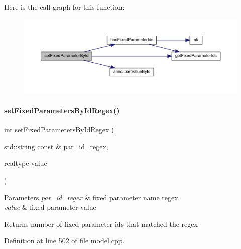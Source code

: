Here is the call graph for this function\+:
\nopagebreak
\begin{figure}[H]
\begin{center}
\leavevmode
\includegraphics[width=350pt]{classamici_1_1_model_adc0d24343c6fed2e797fb402f7c2d256_cgraph}
\end{center}
\end{figure}
\mbox{\label{classamici_1_1_model_acda9b9debfd3d6ac77e2d27a48bfb5d6}} 
\paragraph{\texorpdfstring{set\+Fixed\+Parameters\+By\+Id\+Regex()}{setFixedParametersByIdRegex()}}
{\footnotesize\ttfamily int set\+Fixed\+Parameters\+By\+Id\+Regex (\begin{DoxyParamCaption}\item[{std\+::string const \&}]{par\+\_\+id\+\_\+regex,  }\item[{\mbox{\hyperlink{namespaceamici_a1bdce28051d6a53868f7ccbf5f2c14a3}{realtype}}}]{value }\end{DoxyParamCaption})}


\begin{DoxyParams}{Parameters}
{\em par\+\_\+id\+\_\+regex} & fixed parameter name regex \\
\hline
{\em value} & fixed parameter value \\
\hline
\end{DoxyParams}
\begin{DoxyReturn}{Returns}
number of fixed parameter ids that matched the regex 
\end{DoxyReturn}


Definition at line 502 of file model.\+cpp.

